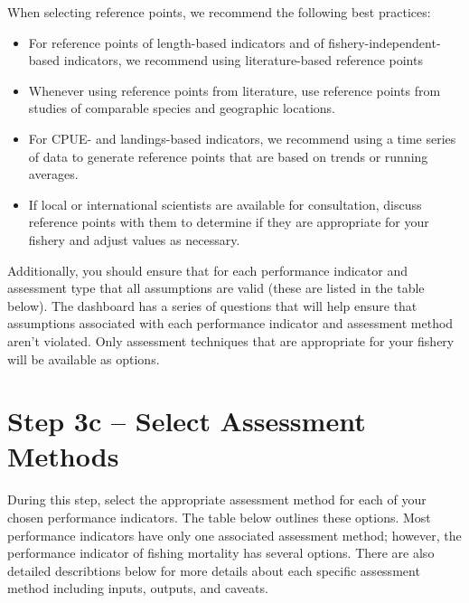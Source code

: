 \documentclass[]{book}
\begin{document}
When selecting reference points, we recommend the following best
practices:

\begin{itemize}
\item
  For reference points of length-based indicators and of
  fishery-independent-based indicators, we recommend using
  literature-based reference points
\item
  Whenever using reference points from literature, use reference points
  from studies of comparable species and geographic locations.
\item
  For CPUE- and landings-based indicators, we recommend using a time
  series of data to generate reference points that are based on trends
  or running averages.
\item
  If local or international scientists are available for consultation,
  discuss reference points with them to determine if they are
  appropriate for your fishery and adjust values as necessary.
\end{itemize}

Additionally, you should ensure that for each performance indicator and
assessment type that all assumptions are valid (these are listed in the
table below). The dashboard has a series of questions that will help
ensure that assumptions associated with each performance indicator and
assessment method aren't violated. Only assessment techniques that are
appropriate for your fishery will be available as options.

\section{Step 3c -- Select Assessment Methods}\label{Step3c}

During this step, select the appropriate assessment method for each of
your chosen performance indicators. The table below outlines these
options. Most performance indicators have only one associated assessment
method; however, the performance indicator of fishing mortality has
several options. There are also detailed describtions below for more
details about each specific assessment method including inputs, outputs,
and caveats.
\end{document}
